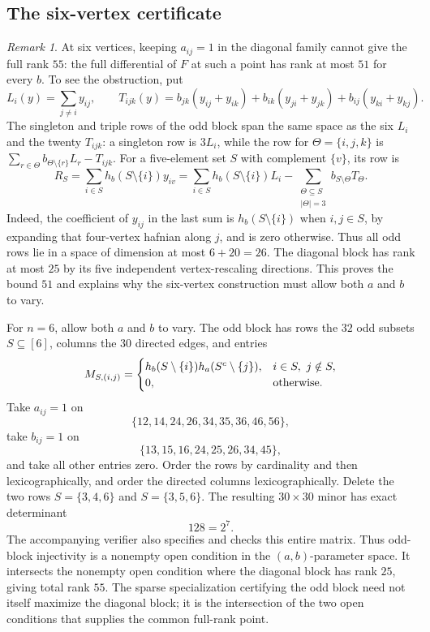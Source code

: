 \documentclass[11pt]{article}
\theoremstyle{remark}\newtheorem{remark}[theorem]{Remark}
\begin{document}
\subsection{The six-vertex certificate}
\begin{remark}\label{rem:six-vertex}
At six vertices, keeping $a_{ij}=1$ in the diagonal family cannot give
the full rank $55$: the full differential of $F$ at such a point has rank at most $51$ for every $b$.
To see the obstruction, put
\[
 L_i(y)=\sum_{j\ne i}y_{ij},\qquad
 T_{ijk}(y)=b_{jk}(y_{ij}+y_{ik})+
 b_{ik}(y_{ji}+y_{jk})+b_{ij}(y_{ki}+y_{kj}).
\]
The singleton and triple rows of the odd block span the same space as
the six $L_i$ and the twenty $T_{ijk}$: a singleton row is $3L_i$,
while the row for $\Theta=\{i,j,k\}$ is
$\sum_{r\in\Theta}b_{\Theta\setminus\{r\}}L_r-T_{ijk}$.
For a five-element set $S$ with complement $\{v\}$, its row is
\[
 R_S=\sum_{i\in S}h_b(S\setminus\{i\})y_{iv}
 =\sum_{i\in S}h_b(S\setminus\{i\})L_i
  -\sum_{\substack{\Theta\subseteq S\\|\Theta|=3}}b_{S\setminus\Theta}T_\Theta.
\]
Indeed, the coefficient of $y_{ij}$ in the last sum is
$h_b(S\setminus\{i\})$ when $i,j\in S$, by expanding that four-vertex
hafnian along $j$, and is zero otherwise. Thus all odd rows lie in a
space of dimension at most $6+20=26$. The diagonal block has rank at
most $25$ by its five independent vertex-rescaling directions. This
proves the bound $51$ and explains why the six-vertex construction must
allow both $a$ and $b$ to vary.
\end{remark}


For $n=6$, allow both $a$ and $b$ to vary. The odd block has rows the
$32$ odd subsets $S\subseteq[6]$, columns the $30$ directed edges, and
entries
\begin{equation}\label{eq:qubit-six-matrix}
 M_{S,(i,j)}=
 \begin{cases}
 h_b(S\setminus\{i\})h_a(S^c\setminus\{j\}),
       &i\in S,\ j\notin S,\\
 0,&\textnormal{otherwise}.
 \end{cases}
\end{equation}
Take $a_{ij}=1$ on
\[
 \{12,14,24,26,34,35,36,46,56\},
\]
take $b_{ij}=1$ on
\[
 \{13,15,16,24,25,26,34,45\},
\]
and take all other entries zero. Order the rows by cardinality and then
lexicographically, and order the directed columns lexicographically.
Delete the two rows $S=\{3,4,6\}$ and $S=\{3,5,6\}$. The resulting
$30\times30$ minor has exact determinant
\begin{equation}\label{eq:qubit-six-det}
 128=2^7.
\end{equation}
The accompanying verifier also specifies and checks this entire matrix.
Thus odd-block injectivity is a nonempty open condition in the
$(a,b)$-parameter space. It intersects the nonempty open condition
where the diagonal block has rank $25$, giving total rank $55$.
The sparse specialization certifying the odd block need not itself
maximize the diagonal block; it is the intersection of the two open
conditions that supplies the common full-rank point.
\end{document}
